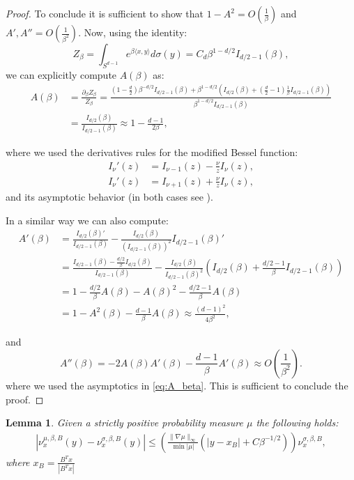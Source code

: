 \documentclass{article}
\numberwithin{theorem}{section}
\newtheorem{lemma}[theorem]{Lemma}
\begin{document}
\begin{proof}
To conclude it is sufficient to show that $1-A^2=O(\frac{1}{\beta})$ and $A', A''=O(\frac{1}{\beta^2})$.
Now, using the identity:
$$
Z_\beta = \int_{S^{d-1}} e^{\beta \langle x, y\rangle} d\sigma(y) = C_d \beta^{1-d/2}I_{d/2-1}(\beta),
$$
we can explicitly compute $A(\beta)$ as:
\begin{equation}
\label{eq:A_beta}
\begin{aligned}
A(\beta) &= \frac{\partial_\beta Z_\beta}{Z_\beta}=\frac{ (1-\frac{d}{2})\beta^{-d/2}I_{d/2-1}(\beta)+ \beta^{1-d/2}(I_{d/2}(\beta)+(\frac{d}{2}-1)\frac{1}{\beta}I_{d/2-1}(\beta))}{ \beta^{1-d/2}I_{d/2-1}(\beta)}\\
&=\frac{I_{d/2}(\beta)}{I_{d/2-1}(\beta)} \approx 1-\frac{d-1}{2\beta},
\end{aligned}
\end{equation}

where we used the derivatives rules for the modified Bessel function:
\begin{align*}
    I_\nu'(z)&=I_{\nu-1}(z)-\frac{\nu}{z}I_\nu(z),\\
    I_\nu'(z)&=I_{\nu+1}(z)+\frac{\nu}{z}I_\nu(z),
\end{align*} 
 and its asymptotic behavior (in both cases see \cite{abramowitz1948handbook}).

In a similar way we can also compute:
\begin{equation}
\label{eq:aprime_beta}
\begin{aligned}
A'(\beta) &= \frac{I_{d/2}(\beta)'}{I_{d/2-1}(\beta)}-\frac{I_{d/2}(\beta)}{\left( I_{d/2-1}(\beta)\right)^2}{I_{d/2-1}(\beta)'}\\
&=\frac{I_{d/2-1}(\beta)-\frac{d/2}{\beta}I_{d/2}(\beta)}{I_{d/2-1}(\beta)}-\frac{I_{d/2}(\beta)}{I_{d/2-1}(\beta)^2}\left( I_{d/2}(\beta)+\frac{d/2-1}{\beta}I_{d/2-1}(\beta)\right)\\
&=1-\frac{d/2}{\beta}A(\beta)-A(\beta)^2-\frac{d/2-1}{\beta}A(\beta)\\
&=1-A^2(\beta) - \frac{d-1}{\beta}A(\beta) \approx \frac{(d-1)^2}{4\beta^2},
\end{aligned}
\end{equation}

and 
$$
A''(\beta) = -2A(\beta)A'(\beta) - \frac{d-1}{\beta}A'(\beta) \approx O(\frac{1}{\beta^2}).
$$
where we used the asymptotics in \eqref{eq:A_beta}. This is sufficient to conclude the proof.
\end{proof}
\begin{lemma}
\label{lem:nu_sigma_mu}
Given a strictly positive probability measure $\mu$ the following holds:
\begin{align*}
    |\nu_x^{\mu, \beta,B}(y)-\nu_x^{\sigma, \beta,B}(y)|\leq \left(\frac{\|\nabla \mu\|_{\infty}}{\min |\mu|}(|y-x_B|+C\beta^{-1/2})\right)\nu_x^{\sigma,\beta, B},
\end{align*}
where $x_B=\frac{B^Tx}{|B^Tx|}$
\end{lemma}
\end{document}
